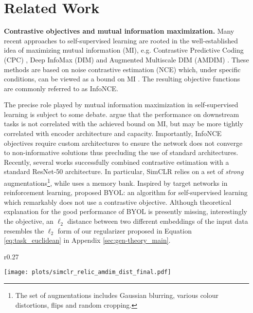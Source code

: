 \documentclass{article}
\newcommand{\feat}{f}
\newcommand{\relic}{\textsc{ReLIC}}
\begin{document}
 \section{Related Work} \label{sec:related}

{\bf Contrastive objectives and mutual information maximization.}
Many recent approaches to self-supervised learning are rooted in the well-established idea of maximizing mutual information (MI), e.g. Contrastive Predictive Coding (CPC) \citep{oord2018representation, henaff2019data}, Deep InfoMax (DIM) \citep{hjelm2018learning} and Augmented Multiscale DIM (AMDIM) \citep{bachman2019learning}. These methods are based on noise contrastive estimation (NCE) \citep{gutmann2010noise} which, under specific conditions, can be viewed as a bound on MI \citep{poole2019variational}. The resulting objective functions are commonly referred to as InfoNCE.

The precise role played by mutual information maximization in self-supervised learning is subject to some debate. \citep{tschannen2019mutual} argue that the performance on downstream tasks is not correlated with the achieved bound on MI, but may be more tightly correlated with encoder architecture and capacity. 
Importantly, InfoNCE objectives require custom architectures to ensure the network does not converge to non-informative solutions thus precluding the use of standard architectures. 
Recently, several works \citep{he2019momentum, chen2020simple} successfully combined contrastive estimation with a standard ResNet-50 architecture.
In particular, SimCLR \citep{chen2020simple} relies on a set of \emph{strong} augmentations\footnote{The set of augmentations includes Gaussian blurring, various colour distortions, flips and random cropping.}, while \citep{he2019momentum} uses a memory bank. Inspired by target networks in reinforcement learning, \citep{grill2020bootstrap} proposed BYOL: an algorithm for self-supervised learning which remarkably does not use a contrastive objective. Although theoretical explanation for the good performance of BYOL is presently missing, interestingly the objective, an $\ell_2$ distance between two different embeddings of the input data resembles the $\ell_2$ form of our regularizer proposed in Equation \ref{eq:task_euclidean} in Appendix \ref{sec:gen-theory_main}. 

\begin{wrapfigure}{r}{0.27\textwidth}
\vspace{-0.5cm}
  \begin{center}
    \texttt{[image: plots/simclr\_relic\_amdim\_dist\_final.pdf]}
  \end{center}
    \caption{Distribution of the linear discriminant ratio ($F_{\text{LDA}}$, see text) of $\feat$ for \relic{}, SimCLR and AMDIM ($y$-axis clipped to aid visualization). \label{fig:distances}}  
  \vspace{-0.3cm}
\end{wrapfigure}
\end{document}
